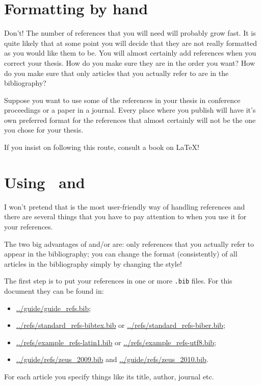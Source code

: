 \section{Formatting by hand}
\label{sec:ref:bibitem}

Don't! The number of references that you will need will probably grow
fast. It is quite likely that at some point you will decide that they
are not really formatted as you would like them to be. You will almost
certainly add references when you correct your thesis. How do you
make sure they are in the order you want? How do you make sure that
only articles that you actually refer to are in the bibliography?

Suppose you want to use some of the references in your thesis in
conference proceedings or a paper in a journal. Every place where you
publish will have it's own preferred format for the references that
almost certainly will not be the one you chose for your thesis.

If you insist on following this route, consult a book on \LaTeX!


\section{Using \BibTeX\ and }
\label{sec:ref:bibtex}

I won't pretend that \BibTeX{} is the most user-friendly way of
handling references and there are several things that you have to pay
attention to when you use it for your references.

The two big advantages of  and/or \BibTeX{} are: only references that you
actually refer to appear in the bibliography; you can change the
format (consistently) of all articles in the bibliography simply by
changing the style!

The first step is to put your references in one or more \texttt{.bib}
files. For this document they can be found in:
\begin{itemize}
\setlength{\itemsep}{0pt}
\item \url{../guide/guide_refs.bib};
\item \url{../refs/standard_refs-bibtex.bib} or
  \url{../refs/standard_refs-biber.bib};
\item \url{../refs/example_refs-latin1.bib} or
  \url{../refs/example_refs-utf8.bib};
\item \url{../guide/refs/zeus_2009.bib} and
  \url{../guide/refs/zeus_2010.bib}.
\end{itemize}
For each article you specify things like its
title, author, journal etc.

